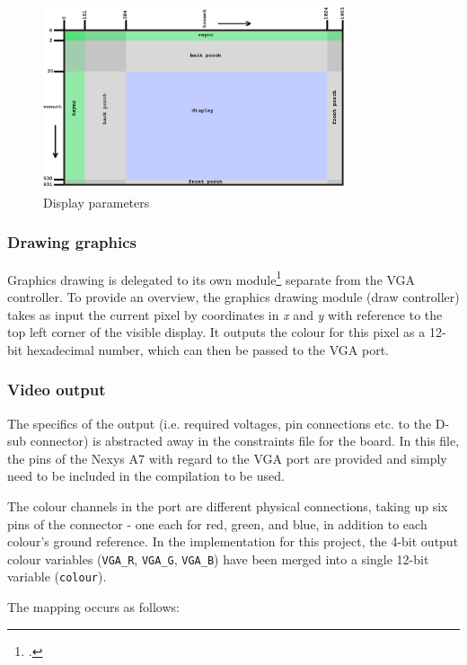\begin{figure}[htbp]
    \centering
    \includegraphics[width=0.8\textwidth]{./figures/vga display.png}
    \caption{Display parameters}\label{fig:vga}
\end{figure}

\subsubsection{Drawing graphics}
Graphics drawing is delegated to its own module\footnote{
    .
} separate from the VGA controller. 
To provide an overview, the graphics drawing module (draw controller) takes as input the 
current pixel by coordinates in \emph{x} and \emph{y} with reference to the top left corner
of the visible display. It outputs the colour for this pixel as a 12-bit hexadecimal number, which can then 
be passed to the VGA port.

\subsubsection{Video output}
The specifics of the output (i.e. required voltages, pin connections etc. to the D-sub connector) is
abstracted away in the constraints file for the board. In this file, the pins of the Nexys A7 
with regard to the VGA port are provided and simply need to be 
included in the compilation to be used. 

The colour channels in the port are different physical connections, taking up six pins of the 
connector - one each for red, green, and blue, in addition to each colour's ground reference. 
In the implementation for this project, the 4-bit output colour variables
(\lstinline{VGA_R}, \lstinline{VGA_G}, \lstinline{VGA_B}) 
have been merged into a single 12-bit variable (\lstinline{colour}). 

The mapping occurs as follows:

